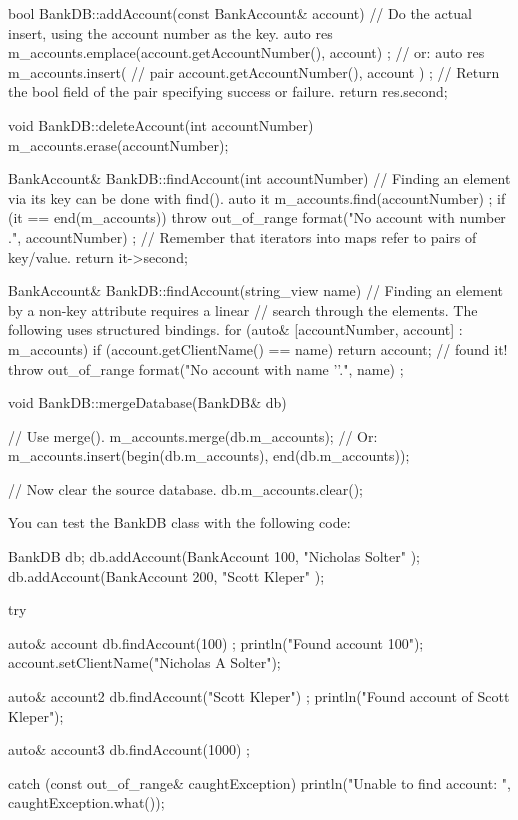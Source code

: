 \begin{cpp}
bool BankDB::addAccount(const BankAccount& account)
{
    // Do the actual insert, using the account number as the key.
    auto res { m_accounts.emplace(account.getAccountNumber(), account) };
    // or: auto res { m_accounts.insert(
        // pair { account.getAccountNumber(), account }) };
    // Return the bool field of the pair specifying success or failure.
    return res.second;
}

void BankDB::deleteAccount(int accountNumber)
{
    m_accounts.erase(accountNumber);
}

BankAccount& BankDB::findAccount(int accountNumber)
{
    // Finding an element via its key can be done with find().
    auto it { m_accounts.find(accountNumber) };
    if (it == end(m_accounts)) {
        throw out_of_range { format("No account with number {}.", accountNumber) };
    }
    // Remember that iterators into maps refer to pairs of key/value.
    return it->second;
}

BankAccount& BankDB::findAccount(string_view name)
{
    // Finding an element by a non-key attribute requires a linear
    // search through the elements. The following uses structured bindings.
    for (auto& [accountNumber, account] : m_accounts) {
        if (account.getClientName() == name) {
            return account; // found it!
        }
    }
    throw out_of_range { format("No account with name '{}'.", name) };
}

void BankDB::mergeDatabase(BankDB& db)
{
    // Use merge().
    m_accounts.merge(db.m_accounts);
    // Or: m_accounts.insert(begin(db.m_accounts), end(db.m_accounts));

    // Now clear the source database.
    db.m_accounts.clear();
}
\end{cpp}

You can test the BankDB class with the following code:

\begin{cpp}
BankDB db;
db.addAccount(BankAccount { 100, "Nicholas Solter" });
db.addAccount(BankAccount { 200, "Scott Kleper" });

try {
    auto& account { db.findAccount(100) };
    println("Found account 100");
    account.setClientName("Nicholas A Solter");

    auto& account2 { db.findAccount("Scott Kleper") };
    println("Found account of Scott Kleper");

    auto& account3 { db.findAccount(1000) };
} catch (const out_of_range& caughtException) {
    println("Unable to find account: {}", caughtException.what());
}
\end{cpp}


